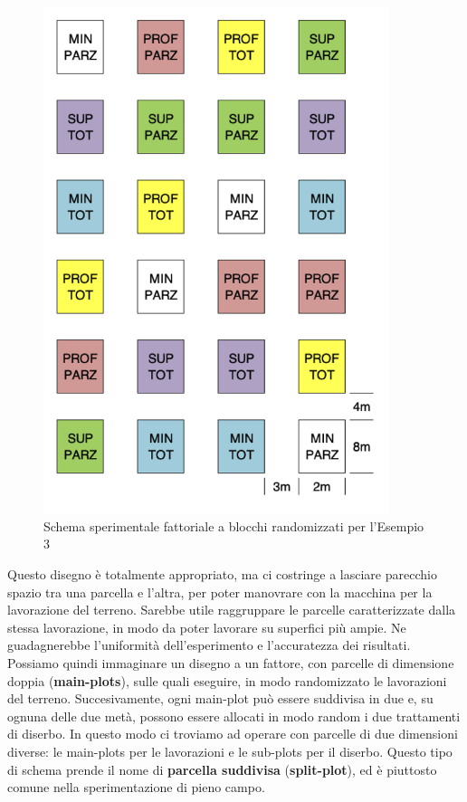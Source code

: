 \documentclass[a4paper,12pt,oneside]{book}
\begin{document}
\begin{figure}
\centering
\includegraphics[width=0.90000\textwidth]{_images/Mappa3FATT.png}
\caption{Schema sperimentale fattoriale a blocchi randomizzati per
l'Esempio 3}
\end{figure}

Questo disegno è totalmente appropriato, ma ci costringe a lasciare
parecchio spazio tra una parcella e l'altra, per poter manovrare con la
macchina per la lavorazione del terreno. Sarebbe utile raggruppare le
parcelle caratterizzate dalla stessa lavorazione, in modo da poter
lavorare su superfici più ampie. Ne guadagnerebbe l'uniformità
dell'esperimento e l'accuratezza dei risultati. Possiamo quindi
immaginare un disegno a un fattore, con parcelle di dimensione doppia
(\textbf{main-plots}), sulle quali eseguire, in modo randomizzato le
lavorazioni del terreno. Succesivamente, ogni main-plot può essere
suddivisa in due e, su ognuna delle due metà, possono essere allocati in
modo random i due trattamenti di diserbo. In questo modo ci troviamo ad
operare con parcelle di due dimensioni diverse: le main-plots per le
lavorazioni e le sub-plots per il diserbo. Questo tipo di schema prende
il nome di \textbf{parcella suddivisa} (\textbf{split-plot}), ed è
piuttosto comune nella sperimentazione di pieno campo.
\end{document}
